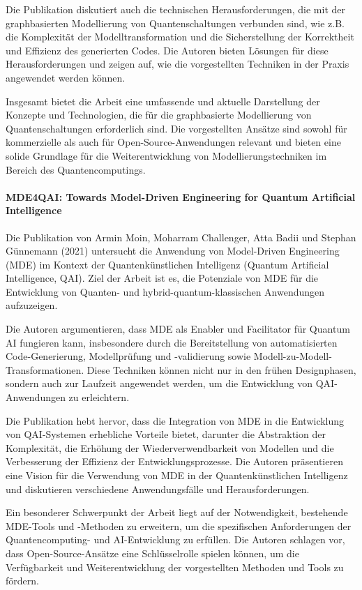 Die Publikation diskutiert auch die technischen Herausforderungen, die mit der graphbasierten Modellierung von 
Quantenschaltungen verbunden sind, wie z.B. die Komplexität der Modelltransformation und die Sicherstellung der 
Korrektheit und Effizienz des generierten Codes. Die Autoren bieten Lösungen für diese Herausforderungen und zeigen 
auf, wie die vorgestellten Techniken in der Praxis angewendet werden können.

Insgesamt bietet die Arbeit eine umfassende und aktuelle Darstellung der Konzepte und Technologien, die für die 
graphbasierte Modellierung von Quantenschaltungen erforderlich sind. Die vorgestellten Ansätze sind sowohl für 
kommerzielle als auch für Open-Source-Anwendungen relevant und bieten eine solide Grundlage für die Weiterentwicklung 
von Modellierungstechniken im Bereich des Quantencomputings.

\paragraph{MDE4QAI: Towards Model-Driven Engineering for Quantum Artificial Intelligence}

Die Publikation von Armin Moin, Moharram Challenger, Atta Badii und Stephan Günnemann (2021) untersucht die Anwendung 
von Model-Driven Engineering (MDE) im Kontext der Quantenkünstlichen Intelligenz (Quantum Artificial Intelligence, QAI). 
Ziel der Arbeit ist es, die Potenziale von MDE für die Entwicklung von Quanten- und hybrid-quantum-klassischen Anwendungen aufzuzeigen.

Die Autoren argumentieren, dass MDE als Enabler und Facilitator für Quantum AI fungieren kann, insbesondere durch 
die Bereitstellung von automatisierten Code-Generierung, Modellprüfung und -validierung sowie Modell-zu-Modell-Transformationen. 
Diese Techniken können nicht nur in den frühen Designphasen, sondern auch zur Laufzeit angewendet werden, um die Entwicklung von QAI-Anwendungen zu erleichtern.

Die Publikation hebt hervor, dass die Integration von MDE in die Entwicklung von QAI-Systemen erhebliche Vorteile 
bietet, darunter die Abstraktion der Komplexität, die Erhöhung der Wiederverwendbarkeit von Modellen und die 
Verbesserung der Effizienz der Entwicklungsprozesse. Die Autoren präsentieren eine Vision für die Verwendung von 
MDE in der Quantenkünstlichen Intelligenz und diskutieren verschiedene Anwendungsfälle und Herausforderungen.

Ein besonderer Schwerpunkt der Arbeit liegt auf der Notwendigkeit, bestehende MDE-Tools und -Methoden zu erweitern, 
um die spezifischen Anforderungen der Quantencomputing- und AI-Entwicklung zu erfüllen. Die Autoren schlagen vor, dass 
Open-Source-Ansätze eine Schlüsselrolle spielen können, um die Verfügbarkeit und Weiterentwicklung der vorgestellten 
Methoden und Tools zu fördern.

